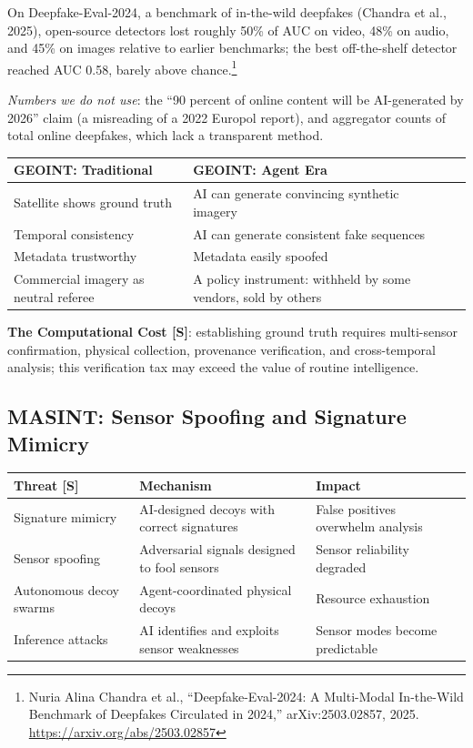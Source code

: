 \documentclass[11pt,letterpaper]{article}
\begin{document}
\begin{warnbox}
On Deepfake-Eval-2024, a benchmark of in-the-wild deepfakes (Chandra et al., 2025), open-source detectors lost roughly 50\% of AUC on video, 48\% on audio, and 45\% on images relative to earlier benchmarks; the best off-the-shelf detector reached AUC 0.58, barely above chance.\footnote{Nuria Alina Chandra et al., ``Deepfake-Eval-2024: A Multi-Modal In-the-Wild Benchmark of Deepfakes Circulated in 2024,'' arXiv:2503.02857, 2025. \url{https://arxiv.org/abs/2503.02857}}

\textit{Numbers we do not use}: the ``90 percent of online content will be AI-generated by 2026'' claim (a misreading of a 2022 Europol report), and aggregator counts of total online deepfakes, which lack a transparent method.
\end{warnbox}

\begin{center}
\small
\begin{tabularx}{\linewidth}{ZY{0.88}Y{1.12}}
\toprule
\textbf{GEOINT: Traditional} & \textbf{GEOINT: Agent Era} \\
\midrule
Satellite shows ground truth & AI can generate convincing synthetic imagery \\
Temporal consistency & AI can generate consistent fake sequences \\
Metadata trustworthy & Metadata easily spoofed \\
Commercial imagery as neutral referee & A policy instrument: withheld by some vendors, sold by others \\
\bottomrule
\end{tabularx}
\end{center}

\textbf{The Computational Cost [S]}: establishing ground truth requires multi-sensor confirmation, physical collection, provenance verification, and cross-temporal analysis; this verification tax may exceed the value of routine intelligence.

\subsection{MASINT: Sensor Spoofing and Signature Mimicry}

\begin{center}
\small
\begin{tabularx}{\linewidth}{ZY{0.69}Y{1.15}Y{1.16}}
\toprule
\textbf{Threat [S]} & \textbf{Mechanism} & \textbf{Impact} \\
\midrule
Signature mimicry & AI-designed decoys with correct signatures & False positives overwhelm analysis \\
Sensor spoofing & Adversarial signals designed to fool sensors & Sensor reliability degraded \\
Autonomous decoy swarms & Agent-coordinated physical decoys & Resource exhaustion \\
Inference attacks & AI identifies and exploits sensor weaknesses & Sensor modes become predictable \\
\bottomrule
\end{tabularx}
\end{center}
\end{document}
